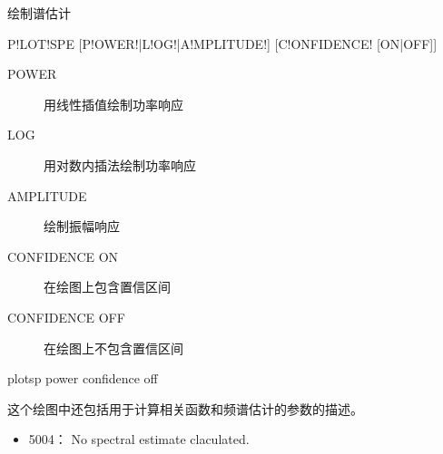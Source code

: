 \label{spe:plotspe}

绘制谱估计

\begin{SACSTX}
P!LOT!SPE [P!OWER!|L!OG!|A!MPLITUDE!] [C!ONFIDENCE! [ON|OFF]]
\end{SACSTX}

\begin{description}
\item [POWER] 用线性插值绘制功率响应
\item [LOG] 用对数内插法绘制功率响应
\item [AMPLITUDE] 绘制振幅响应
\item [CONFIDENCE ON] 在绘图上包含置信区间
\item [CONFIDENCE OFF] 在绘图上不包含置信区间
\end{description}

\begin{SACDFT}
plotsp power confidence off
\end{SACDFT}

这个绘图中还包括用于计算相关函数和频谱估计的参数的描述。

\begin{itemize}
\item 5004： No spectral estimate claculated.
\end{itemize}
